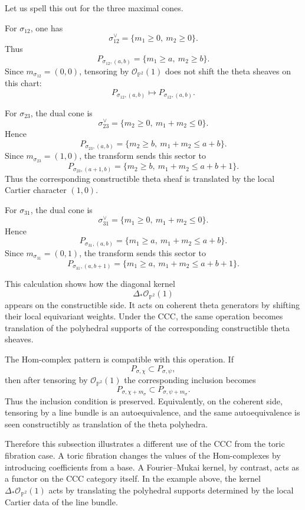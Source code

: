 Let us spell this out for the three maximal cones.

For \(\sigma_{12}\), one has
\[
\sigma_{12}^\vee
=
\{m_1\ge 0,\ m_2\ge 0\}.
\]
Thus
\[
P_{\sigma_{12},(a,b)}
=
\{m_1\ge a,\ m_2\ge b\}.
\]
Since \(m_{\sigma_{12}}=(0,0)\), tensoring by
\(\mathcal O_{\mathbb P^2}(1)\) does not shift the theta sheaves on this chart:
\[
P_{\sigma_{12},(a,b)}
\longmapsto
P_{\sigma_{12},(a,b)}.
\]

For \(\sigma_{23}\), the dual cone is
\[
\sigma_{23}^\vee
=
\{m_2\ge 0,\ m_1+m_2\le 0\}.
\]
Hence
\[
P_{\sigma_{23},(a,b)}
=
\{m_2\ge b,\ m_1+m_2\le a+b\}.
\]
Since \(m_{\sigma_{23}}=(1,0)\), the transform sends this sector to
\[
P_{\sigma_{23},(a+1,b)}
=
\{m_2\ge b,\ m_1+m_2\le a+b+1\}.
\]
Thus the corresponding constructible theta sheaf is translated by the local
Cartier character \((1,0)\).

For \(\sigma_{31}\), the dual cone is
\[
\sigma_{31}^\vee
=
\{m_1\ge 0,\ m_1+m_2\le 0\}.
\]
Hence
\[
P_{\sigma_{31},(a,b)}
=
\{m_1\ge a,\ m_1+m_2\le a+b\}.
\]
Since \(m_{\sigma_{31}}=(0,1)\), the transform sends this sector to
\[
P_{\sigma_{31},(a,b+1)}
=
\{m_1\ge a,\ m_1+m_2\le a+b+1\}.
\]

This calculation shows how the diagonal kernel
\[
\Delta_*\mathcal O_{\mathbb P^2}(1)
\]
appears on the constructible side. It acts on coherent theta generators by
shifting their local equivariant weights. Under the CCC, the same operation
becomes translation of the polyhedral supports of the corresponding
constructible theta sheaves.

The Hom-complex pattern is compatible with this operation. If
\[
P_{\sigma,\chi}\subset P_{\sigma,\psi},
\]
then after tensoring by \(\mathcal O_{\mathbb P^2}(1)\) the corresponding
inclusion becomes
\[
P_{\sigma,\chi+m_\sigma}\subset P_{\sigma,\psi+m_\sigma}.
\]
Thus the inclusion condition is preserved. Equivalently, on the coherent side,
tensoring by a line bundle is an autoequivalence, and the same autoequivalence
is seen constructibly as translation of the theta polyhedra.

Therefore this subsection illustrates a different use of the CCC from the
toric fibration case. A toric fibration changes the values of the Hom-complexes
by introducing coefficients from a base. A Fourier--Mukai kernel, by contrast,
acts as a functor on the CCC category itself. In the example above, the kernel
\(\Delta_*\mathcal O_{\mathbb P^2}(1)\) acts by translating the polyhedral
supports determined by the local Cartier data of the line bundle.
